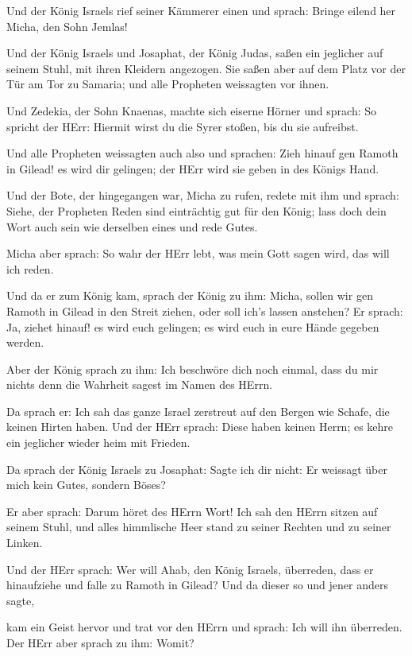  Und der König Israels rief seiner Kämmerer einen und
sprach: Bringe eilend her Micha, den Sohn Jemlas!

 Und der König Israels und Josaphat, der König Judas, saßen
ein jeglicher auf seinem Stuhl, mit ihren Kleidern angezogen. Sie saßen
aber auf dem Platz vor der Tür am Tor zu Samaria; und alle Propheten
weissagten vor ihnen.

 Und Zedekia, der Sohn Knaenas, machte sich eiserne Hörner
und sprach: So spricht der HErr: Hiermit wirst du die Syrer stoßen, bis
du sie aufreibst.

 Und alle Propheten weissagten auch also und sprachen: Zieh
hinauf gen Ramoth in Gilead! es wird dir gelingen; der HErr wird sie
geben in des Königs Hand.

 Und der Bote, der hingegangen war, Micha zu rufen, redete
mit ihm und sprach: Siehe, der Propheten Reden sind einträchtig gut für
den König; lass doch dein Wort auch sein wie derselben eines und rede
Gutes.

 Micha aber sprach: So wahr der HErr lebt, was mein Gott
sagen wird, das will ich reden.

 Und da er zum König kam, sprach der König zu ihm: Micha,
sollen wir gen Ramoth in Gilead in den Streit ziehen, oder soll ich's
lassen anstehen? Er sprach: Ja, ziehet hinauf! es wird euch gelingen; es
wird euch in eure Hände gegeben werden.

 Aber der König sprach zu ihm: Ich beschwöre dich noch
einmal, dass du mir nichts denn die Wahrheit sagest im Namen des HErrn.

 Da sprach er: Ich sah das ganze Israel zerstreut auf den
Bergen wie Schafe, die keinen Hirten haben. Und der HErr sprach: Diese
haben keinen Herrn; es kehre ein jeglicher wieder heim mit Frieden.

 Da sprach der König Israels zu Josaphat: Sagte ich dir
nicht: Er weissagt über mich kein Gutes, sondern Böses?

 Er aber sprach: Darum höret des HErrn Wort! Ich sah den
HErrn sitzen auf seinem Stuhl, und alles himmlische Heer stand zu seiner
Rechten und zu seiner Linken.

 Und der HErr sprach: Wer will Ahab, den König Israels,
überreden, dass er hinaufziehe und falle zu Ramoth in Gilead? Und da
dieser so und jener anders sagte,

 kam ein Geist hervor und trat vor den HErrn und sprach:
Ich will ihn überreden. Der HErr aber sprach zu ihm: Womit?

